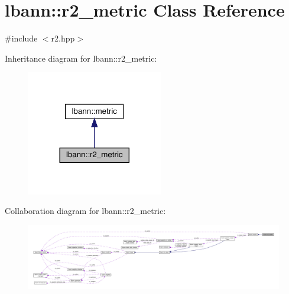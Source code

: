 \hypertarget{classlbann_1_1r2__metric}{}\section{lbann\+:\+:r2\+\_\+metric Class Reference}
\label{classlbann_1_1r2__metric}


{\ttfamily \#include $<$r2.\+hpp$>$}



Inheritance diagram for lbann\+:\+:r2\+\_\+metric\+:\nopagebreak
\begin{figure}[H]
\begin{center}
\leavevmode
\includegraphics[width=168pt]{classlbann_1_1r2__metric__inherit__graph}
\end{center}
\end{figure}


Collaboration diagram for lbann\+:\+:r2\+\_\+metric\+:\nopagebreak
\begin{figure}[H]
\begin{center}
\leavevmode
\includegraphics[width=350pt]{classlbann_1_1r2__metric__coll__graph}
\end{center}
\end{figure}
